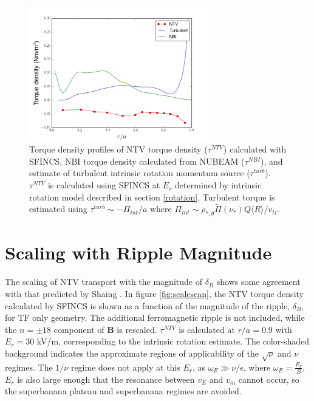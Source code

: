 \documentclass{article}
\begin{document}
\begin{figure}[h!]
\centering
\includegraphics[width=0.7\textwidth]{AllTorquePlot.png}
\caption{Torque density profiles of NTV torque density ($\tau^{NTV}$) calculated with SFINCS, NBI torque density calculated from NUBEAM ($\tau^{NBI}$), and estimate of turbulent intrinsic rotation momentum source ($\tau^{turb}$). $\tau^{NTV}$ is calculated using SFINCS at $E_r$ determined by intrinsic rotation model described in section \ref{rotation}. Turbulent torque is estimated using $\tau^{turb} \sim -\Pi_{int}/a$ where $\Pi_{int} \sim \rho_{*, \theta} \widetilde{\Pi}(\nu_*) Q \langle R \rangle/v_{ti}$.}
\end{figure}\label{fig:alltorque}

\FloatBarrier

\section{Scaling with Ripple Magnitude}\label{scaling}
The scaling of NTV transport with the magnitude of $\delta_B$ shows some agreement with that predicted by Shaing \cite{Shaing2008}. In figure \ref{fig:scalescan}, the NTV torque density calculated by SFINCS is shown as a function of the magnitude of the ripple, $\delta_B$, for TF only geometry. The additional ferromagnetic ripple is not included, while the $n= \pm18$ component of $\bm{B}$ is rescaled. $\tau^{NTV}$ is calculated at $r/a = 0.9$ with $E_r = 30$ kV/m, corresponding to the intrinsic rotation estimate. The color-shaded background indicates the approximate regions of applicability of the $\sqrt{\nu}$ and $\nu$ regimes. The $1/\nu$ regime does not apply at this $E_r$, as $\omega_E \gg \nu/\epsilon$, where $\omega_E = \frac{E_r}{B}$. $E_r$ is also large enough that the resonance between $v_{E}$ and $v_{m}$ cannot occur, so the superbanana plateau and superbanana regimes are avoided. 
\end{document}
